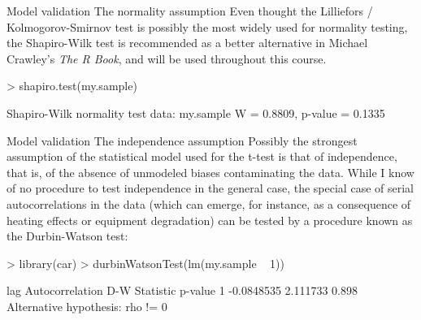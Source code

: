 \documentclass[t]{beamer}
\begin{document}

\begin{ftstf}
{Model validation}
{The normality assumption}
Even thought the Lilliefors / Kolmogorov-Smirnov test is possibly the most widely used for normality testing, the Shapiro-Wilk test is recommended as a better alternative in Michael Crawley's \textit{The R Book}, and will be used throughout this course.
\vhalf
\begin{rcode}
> shapiro.test(my.sample)

Shapiro-Wilk normality test
data:  my.sample
W = 0.8809, p-value = 0.1335
\end{rcode}
\end{ftstf}


\begin{ftstf}
{Model validation}
{The independence assumption}
Possibly the strongest assumption of the statistical model used for the t-test is that of independence, that is, of the absence of unmodeled biases contaminating the data.
\vhalf
While I know of no procedure to test independence in the general case, the special case of serial autocorrelations in the data (which can emerge, for instance, as a consequence of heating effects or equipment degradation) can be tested by a procedure known as the Durbin-Watson test:
\begin{rcode}
> library(car)
> durbinWatsonTest(lm(my.sample ~ 1))

lag Autocorrelation D-W Statistic p-value
1      -0.0848535      2.111733   0.898
Alternative hypothesis: rho != 0
\end{rcode}
\end{ftstf}
\end{document}
